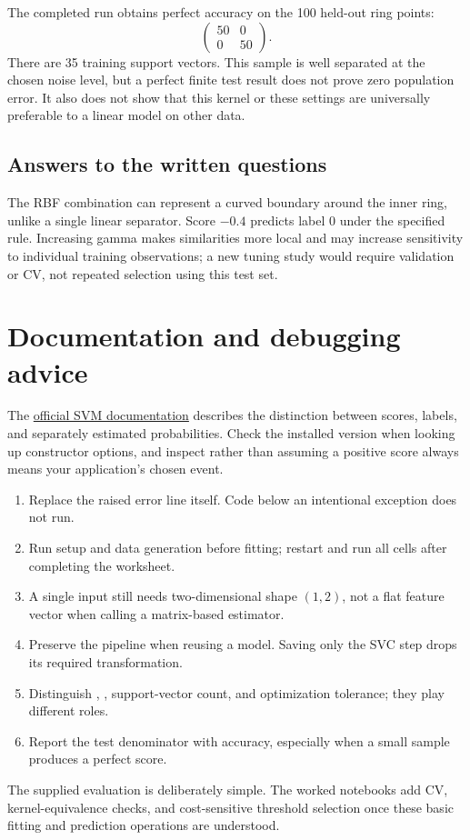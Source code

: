 The completed run obtains perfect accuracy on the 100 held-out ring points:
\[\begin{pmatrix}50&0\\0&50\end{pmatrix}.\]
There are 35 training support vectors. This sample is well separated at the chosen noise level, but a perfect
finite test result does not prove zero population error. It also does not show that this kernel or these settings
are universally preferable to a linear model on other data.

\subsection{Answers to the written questions}
The RBF combination can represent a curved boundary around the inner ring, unlike a single linear separator.
Score $-0.4$ predicts label 0 under the specified rule. Increasing gamma makes similarities more local and may
increase sensitivity to individual training observations; a new tuning study would require validation or CV,
not repeated selection using this test set.

\newpage
\section*{Documentation and debugging advice}
The \href{https://scikit-learn.org/1.8/modules/svm.html}{official SVM documentation} describes the distinction
between scores, labels, and separately estimated probabilities. Check the installed version when looking up
constructor options, and inspect  rather than assuming a positive score always means your
application's chosen event.

\begin{enumerate}
\item Replace the raised error line itself. Code below an intentional exception does not run.
\item Run setup and data generation before fitting; restart and run all cells after completing the worksheet.
\item A single input still needs two-dimensional shape $(1,2)$, not a flat feature vector when calling a matrix-based estimator.
\item Preserve the pipeline when reusing a model. Saving only the SVC step drops its required transformation.
\item Distinguish , , support-vector count, and optimization tolerance; they play different roles.
\item Report the test denominator with accuracy, especially when a small sample produces a perfect score.
\end{enumerate}
The supplied evaluation is deliberately simple. The worked notebooks add CV, kernel-equivalence checks,
and cost-sensitive threshold selection once these basic fitting and prediction operations are understood.

